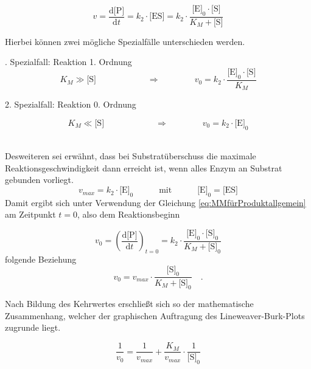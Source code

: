 \begin{equation}
v=\frac{\text{d[P]}}{\text{d}t}=k_2\cdot\text{[ES]} =k_2\cdot \frac{\text{[E]}_0\cdot\text{[S]}}{K_M+\text{[S]}}
\label{eq:MMfürProduktallgemein}
\end{equation}


Hierbei können zwei mögliche Spezialfälle unterschieden werden.
\\
\par
\begingroup
\leftskip=1cm %
. Spezialfall: Reaktion 1. Ordnung
\begin{equation}
K_M \gg \text{[S]}\quad\quad\quad\quad\quad\quad \Longrightarrow \quad\quad\quad\quad v_0=k_2\cdot \frac{\text{[E]}_0\cdot\text{[S]}}{K_M}
\end{equation}

2. Spezialfall: Reaktion 0. Ordnung

\begin{equation}
K_M \ll \text{[S]}\quad\quad\quad\quad\quad\quad \Longrightarrow \quad\quad\quad\quad v_0=k_2\cdot \text{[E]}_0
\end{equation}
\\
\par
\endgroup
Desweiteren sei erwähnt, dass bei Substratüberschuss die maximale Reaktionsgeschwindigkeit dann erreicht ist, wenn alles Enzym an Substrat gebunden vorliegt.
\begin{equation}
v_{max}=k_2\cdot\text{[E]}_0\quad\quad\quad \text{mit}\quad\quad\quad\text{[E]}_0=\text{[ES]}
\label{eq:vmaxmitk2}
\end{equation}
Damit ergibt sich unter Verwendung der Gleichung \ref{eq:MMfürProduktallgemein} 
am Zeitpunkt $t=0$, also dem Reaktionsbeginn 

\begin{equation}
v_0=\left(\frac{\text{d[P]}}{\text{d}t}\right)_{t=0}=k_2\cdot \frac{\text{[E]}_0\cdot\text{[S]}_0}{K_M+\text{[S]}_0}
\label{eq:MMfürProduktbeinull}
\end{equation}
 folgende Beziehung
\begin{equation}
v_0=v_{max}\cdot \frac{\text{[S]}_0}{K_M+\text{[S]}_0}\quad\text{.}
\end{equation}

Nach Bildung des Kehrwertes erschließt sich so der mathematische Zusammenhang, welcher der graphischen Auftragung des Lineweaver-Burk-Plots zugrunde liegt.

\begin{equation}
\frac{1}{v_{0}}=\frac{1}{v_{max}}+\frac{K_M}{v_{max}}\cdot \frac{1}{\text{[S]}_0}
\label{eq:lineweaverPlot}
\end{equation}